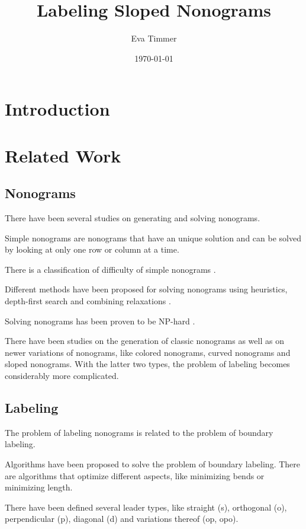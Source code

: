 \documentclass[a4paper]{article}
\title{Labeling Sloped Nonograms}
\author{Eva Timmer}
\date{\today}
\begin{document}
\maketitle

\section{Introduction}

\section{Related Work}

\subsection{Nonograms}
There have been several studies on generating and solving nonograms.  

Simple nonograms are nonograms that have an unique solution and can be solved by looking at only one row or column at a time.

There is a classification of difficulty of simple nonograms \cite{batenburg2009constructing}.

Different methods have been proposed for solving nonograms using heuristics\cite{salcedo2007solving}, depth-first search \cite{yu2011efficient} and combining relaxations \cite{batenburg2009solving}.

Solving nonograms has been proven to be NP-hard \cite{ueda1996np}. 

There have been studies on the generation of classic nonograms as well as on newer variations of nonograms, like colored nonograms, curved nonograms\cite{van2017improved} and sloped nonograms. With the latter two types, the problem of labeling becomes considerably more complicated.

\subsection{Labeling}
The problem of labeling nonograms is related to the problem of boundary labeling. 

Algorithms have been proposed to solve the problem of boundary labeling. There are algorithms that optimize different aspects, like minimizing bends or minimizing length\cite{bekos2007boundary}.

There have been defined several leader types, like straight (s), orthogonal (o), perpendicular (p), diagonal (d) and variations thereof (op, opo)\cite{bekos2010boundary}.
\end{document}

